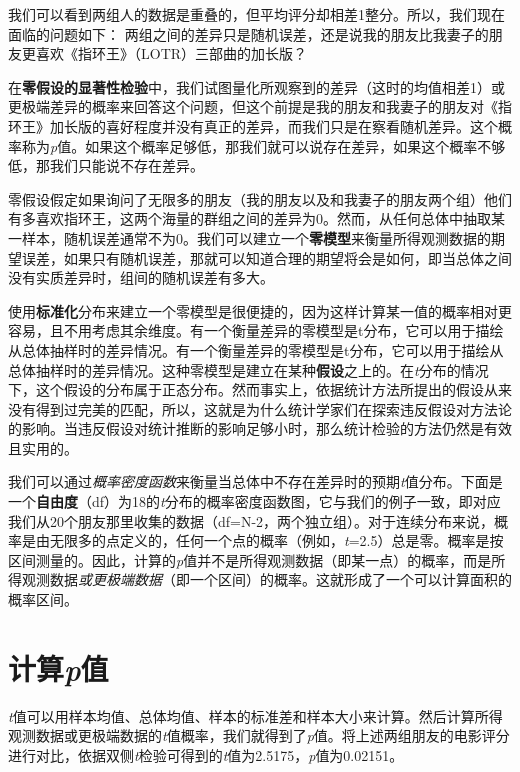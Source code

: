 \documentclass[
  letterpaper,
  DIV=11,
  numbers=noendperiod]{scrreprt}
\begin{document}
我们可以看到两组人的数据是重叠的，但平均评分却相差1整分。所以，我们现在面临的问题如下：
两组之间的差异只是随机误差，还是说我的朋友比我妻子的朋友更喜欢《指环王》（LOTR）三部曲的加长版？

在\textbf{零假设的显著性检验}中，我们试图量化所观察到的差异（这时的均值相差1）或更极端差异的概率来回答这个问题，但这个前提是我的朋友和我妻子的朋友对《指环王》加长版的喜好程度并没有真正的差异，而我们只是在察看随机差异。这个概率称为\emph{p}值。如果这个概率足够低，那我们就可以说存在差异，如果这个概率不够低，那我们只能说不存在差异。

零假设假定如果询问了无限多的朋友（我的朋友以及和我妻子的朋友两个组）他们有多喜欢指环王，这两个海量的群组之间的差异为0。然而，从任何总体中抽取某一样本，随机误差通常不为0。我们可以建立一个\textbf{零模型}来衡量所得观测数据的期望误差，如果只有随机误差，那就可以知道合理的期望将会是如何，即当总体之间没有实质差异时，组间的随机误差有多大。

使用\textbf{标准化}分布来建立一个零模型是很便捷的，因为这样计算某一值的概率相对更容易，且不用考虑其余维度。有一个衡量差异的零模型是t分布，它可以用于描绘从总体抽样时的差异情况。有一个衡量差异的零模型是t分布，它可以用于描绘从总体抽样时的差异情况。这种零模型是建立在某种\textbf{假设}之上的。在\emph{t}分布的情况下，这个假设的分布属于正态分布。然而事实上，依据统计方法所提出的假设从来没有得到过完美的匹配，所以，这就是为什么统计学家们在探索违反假设对方法论的影响。当违反假设对统计推断的影响足够小时，那么统计检验的方法仍然是有效且实用的。

我们可以通过\emph{概率密度函数}来衡量当总体中不存在差异时的预期\emph{t}值分布。下面是一个\textbf{自由度}（df）为18的\emph{t}分布的概率密度函数图，它与我们的例子一致，即对应我们从20个朋友那里收集的数据（df=N-2，两个独立组）。对于连续分布来说，概率是由无限多的点定义的，任何一个点的概率（例如，\emph{t}=2.5）总是零。概率是按区间测量的。因此，计算的\emph{p}值并不是所得观测数据（即某一点）的概率，而是所得观测数据\emph{或更极端数据}（即一个区间）的概率。这就形成了一个可以计算面积的概率区间。

\hypertarget{ux8ba1ux7b97pux503c}{%
\section{\texorpdfstring{计算\emph{p}值}{计算p值}}\label{ux8ba1ux7b97pux503c}}

\emph{t}值可以用样本均值、总体均值、样本的标准差和样本大小来计算。然后计算所得观测数据或更极端数据的\emph{t}值概率，我们就得到了\emph{p}值。将上述两组朋友的电影评分进行对比，依据双侧\emph{t}检验可得到的\emph{t}值为2.5175，\emph{p}值为0.02151。
\end{document}
